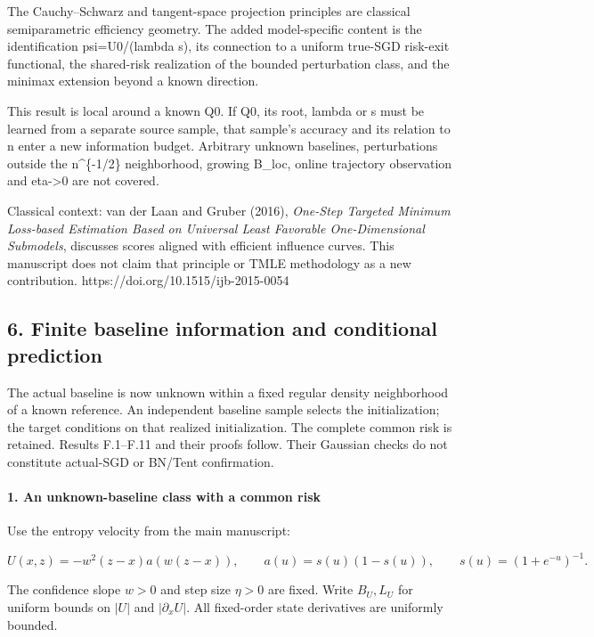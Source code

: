 The Cauchy--Schwarz and tangent-space projection principles are
classical semiparametric efficiency geometry. The added model-specific
content is the identification psi=U0/(lambda s), its connection to a
uniform true-SGD risk-exit functional, the shared-risk realization of
the bounded perturbation class, and the minimax extension beyond a known
direction.

This result is local around a known Q0. If Q0, its root, lambda or s
must be learned from a separate source sample, that sample's accuracy
and its relation to n enter a new information budget. Arbitrary unknown
baselines, perturbations outside the n\^{}\{-1/2\} neighborhood, growing
B\_loc, online trajectory observation and eta-\textgreater0 are not
covered.

Classical context: van der Laan and Gruber (2016), \emph{One-Step
Targeted Minimum Loss-based Estimation Based on Universal Least
Favorable One-Dimensional Submodels}, discusses scores aligned with
efficient influence curves. This manuscript does not claim that
principle or TMLE methodology as a new contribution.
https://doi.org/10.1515/ijb-2015-0054

\subsection{6. Finite baseline information and conditional
prediction}\label{finite-baseline-information-and-conditional-prediction}

The actual baseline is now unknown within a fixed regular density
neighborhood of a known reference. An independent baseline sample
selects the initialization; the target conditions on that realized
initialization. The complete common risk is retained. Results F.1--F.11
and their proofs follow. Their Gaussian checks do not constitute
actual-SGD or BN/Tent confirmation.

\paragraph{1. An unknown-baseline class with a common
risk}\label{an-unknown-baseline-class-with-a-common-risk}

Use the entropy velocity from the main manuscript:

\[
U(x,z)=-w^2(z-x)a(w(z-x)),\qquad
a(u)=s(u)(1-s(u)),\qquad s(u)=(1+e^{-u})^{-1}.
\]

The confidence slope \(w>0\) and step size \(\eta>0\) are fixed. Write
\(B_U,L_U\) for uniform bounds on \(|U|\) and \(|\partial_xU|\). All
fixed-order state derivatives are uniformly bounded.

